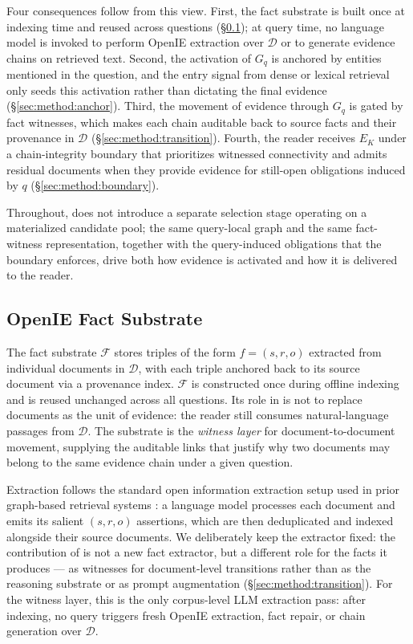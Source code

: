 Four consequences follow from this view. First, the fact substrate is
built once at indexing time and reused across questions
(\S\ref{sec:method:substrate}); at query time, no language model is invoked
to perform OpenIE extraction over $\mathcal{D}$ or to generate evidence
chains on retrieved text. Second, the activation of $G_q$ is anchored by
entities mentioned in the question, and the entry signal from dense or
lexical retrieval only seeds this activation rather than dictating the
final evidence (\S\ref{sec:method:anchor}). Third, the movement of evidence
through $G_q$ is gated by fact witnesses, which makes each chain auditable
back to source facts and their provenance in $\mathcal{D}$
(\S\ref{sec:method:transition}).
Fourth, the reader receives $E_K$ under a chain-integrity boundary that
prioritizes witnessed connectivity and admits residual documents when
they provide evidence for still-open obligations induced by $q$
(\S\ref{sec:method:boundary}).

Throughout, \methodname{} does not introduce a separate selection stage
operating on a materialized candidate pool; the same query-local graph and
the same fact-witness representation, together with the query-induced
obligations that the boundary enforces, drive both how evidence is activated
and how it is delivered to the reader.

\subsection{OpenIE Fact Substrate}
\label{sec:method:substrate}

The fact substrate $\mathcal{F}$ stores triples of the form
$f = (s, r, o)$ extracted from individual documents in $\mathcal{D}$, with
each triple anchored back to its source document via a provenance index.
$\mathcal{F}$ is constructed once during offline indexing and is reused
unchanged across all questions. Its role in \methodname{} is not to replace
documents as the unit of evidence: the reader still consumes natural-language
passages from $\mathcal{D}$. The substrate is the \emph{witness layer} for
document-to-document movement, supplying the auditable links that justify
why two documents may belong to the same evidence chain under a given
question.

Extraction follows the standard open information extraction setup used in
prior graph-based retrieval systems
\citep{angeli2015leveraging,gutierrez2025hipporag}: a language model
processes each document and emits its salient $(s, r, o)$ assertions, which
are then deduplicated and indexed alongside their source documents. We
deliberately keep the extractor fixed: the contribution of \methodname{} is
not a new fact extractor, but a different role for the facts it produces
--- as witnesses for document-level transitions rather than as the
reasoning substrate or as prompt augmentation (\S\ref{sec:method:transition}).
For the witness layer, this is the only corpus-level LLM extraction pass:
after indexing, no query triggers fresh OpenIE extraction, fact repair, or
chain generation over $\mathcal{D}$.


